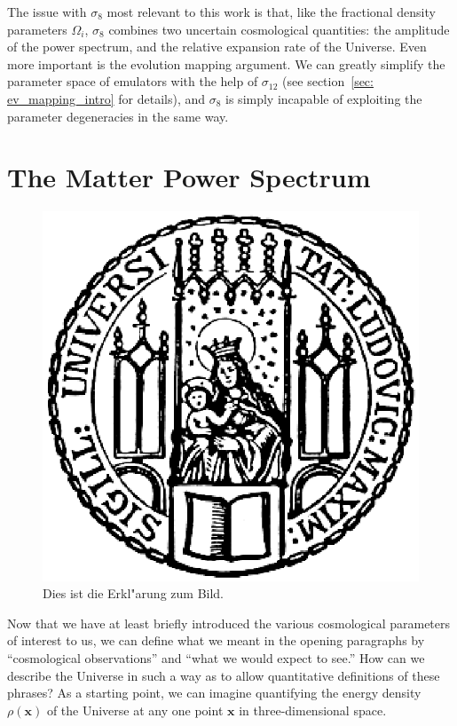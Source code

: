 The issue with $\sigma_8$ most relevant to this work is that, like the
fractional density parameters $\Omega_i$, $\sigma_8$ combines two uncertain
cosmological quantities: the amplitude of the power spectrum, and the
relative expansion rate of the Universe. Even more important is the evolution 
mapping argument. We can greatly simplify the
parameter space of emulators with the help of $\sigma_{12}$
(see section~\ref{sec: ev_mapping_intro} for details), and $\sigma_8$
is simply incapable of exploiting the parameter degeneracies in the same way.


\section{The Matter Power Spectrum}
\label{sec: Pk_intro}


\begin{figure}[htb]
  \centering
  \includegraphics[scale=0.5]{siegel}
  \caption[Kurzform f"ur das Abbildungsverzeichnis]{Dies ist die Erkl"arung zum Bild.}
\end{figure}

Now that we have at least briefly introduced the various cosmological
parameters of interest to us, we can define what we meant in the opening
paragraphs by ``cosmological observations'' and ``what we would expect to
see.'' How can we describe the Universe in such a way as to allow quantitative 
definitions of these phrases? As a starting point, we can imagine quantifying 
the energy density $\rho(\bm{x})$ of the Universe at any one point $\bm{x}$ in 
three-dimensional space.

